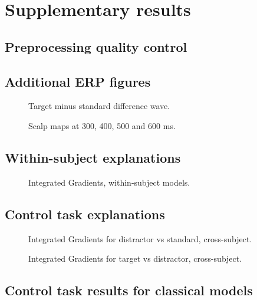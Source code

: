 \chapter{Supplementary results}
\label{app:supp}

\section{Preprocessing quality control}

\section{Additional ERP figures}
\begin{figure}[H]
\centering
{}
\caption{Target minus standard difference wave. }
\end{figure}

\begin{figure}[H]
\centering
{}
\caption{Scalp maps at 300, 400, 500 and 600 ms. }
\end{figure}

\section{Within-subject explanations}
\begin{figure}[H]
\centering
{}
\caption{Integrated Gradients, within-subject models. }
\end{figure}

\section{Control task explanations}
\begin{figure}[H]
\centering
{}
\caption{Integrated Gradients for distractor vs standard, cross-subject. }
\end{figure}

\begin{figure}[H]
\centering
{}
\caption{Integrated Gradients for target vs distractor, cross-subject. }
\end{figure}

\section{Control task results for classical models}

